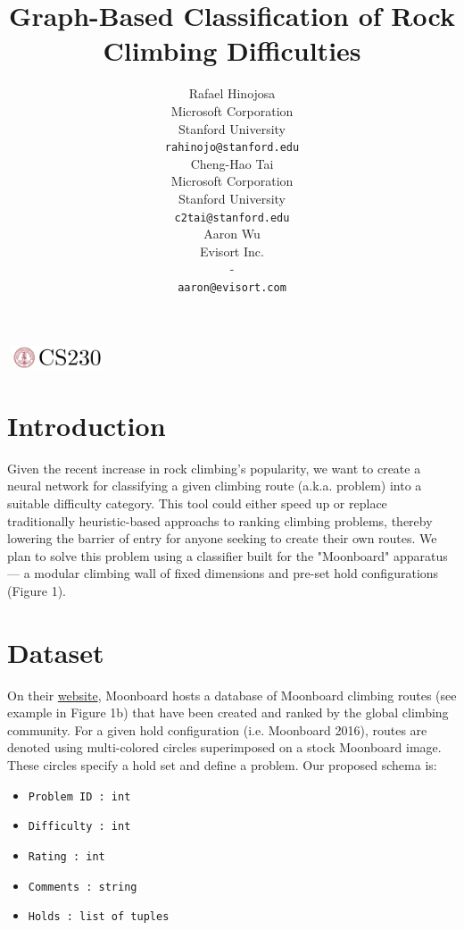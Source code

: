 \documentclass{article}
\title{Graph-Based Classification of Rock Climbing Difficulties}
\author{
  Rafael Hinojosa \\
  Microsoft Corporation \\
  Stanford University \\
  \texttt{rahinojo@stanford.edu} \\ 
  \And
  Cheng-Hao Tai \\
  Microsoft Corporation \\
  Stanford University \\
  \texttt{c2tai@stanford.edu} \\
  \And
  Aaron Wu \\
  Evisort Inc. \\
  - \\
  \texttt{aaron@evisort.com} \\
}
\begin{document}
\begin{center}
\includegraphics[width=3cm, height=0.7cm]{CS230}
\end{center}

\maketitle

\section{Introduction}	
Given the recent increase in rock climbing's popularity, we want to create a neural network for classifying a given climbing route (a.k.a. problem) into a suitable difficulty category. This tool could either speed up or replace traditionally heuristic-based approachs to ranking climbing problems, thereby lowering the barrier of entry for anyone seeking to create their own routes. We plan to solve this problem using a classifier built for the "Moonboard" apparatus --- a modular climbing wall of fixed dimensions and pre-set hold configurations (Figure 1). 

\section{Dataset}
On their \href{https://moonboard.com/}{website}, Moonboard hosts a database of Moonboard climbing routes (see example in Figure 1b) that have been created and ranked by the global climbing community. For a given hold configuration (i.e. Moonboard 2016), routes are denoted using multi-colored circles superimposed on a stock Moonboard image. These circles specify a hold set and define a problem. Our proposed schema is:

\begin{itemize}
\setlength\itemsep{0.1em}
\item \texttt{Problem ID : int}
\item \texttt{Difficulty : int}
\item \texttt{Rating : int}
\item \texttt{Comments : string}
\item \texttt{Holds : list of tuples}
\end{itemize}
\end{document}
